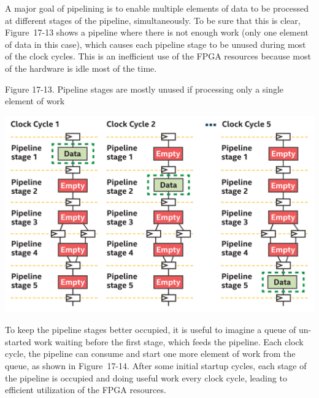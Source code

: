 A major goal of pipelining is to enable multiple elements of data to be processed at different stages of the pipeline, simultaneously. To be sure that this is clear, Figure 17-13 shows a pipeline where there is not enough work (only one element of data in this case), which causes each pipeline stage to be unused during most of the clock cycles. This is an inefficient use of the FPGA resources because most of the hardware is idle most of the time.\par

\hspace*{\fill} \par %
Figure 17-13. Pipeline stages are mostly unused if processing only a single element of work
\begin{center}
	\includegraphics[width=1.0\textwidth]{content/chapter-17/images/12}
\end{center}

To keep the pipeline stages better occupied, it is useful to imagine a queue of un-started work waiting before the first stage, which feeds the pipeline. Each clock cycle, the pipeline can consume and start one more element of work from the queue, as shown in Figure 17-14. After some initial startup cycles, each stage of the pipeline is occupied and doing useful work every clock cycle, leading to efficient utilization of the FPGA resources.\par

